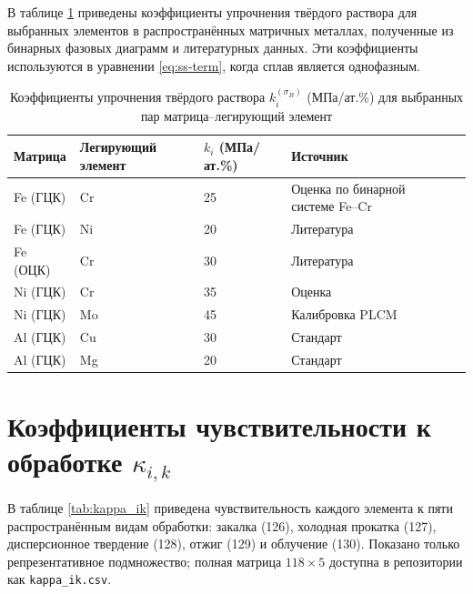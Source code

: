 \documentclass[12pt,a4paper]{article}
\begin{document}
	В таблице \ref{tab:kss} приведены коэффициенты упрочнения твёрдого раствора для выбранных элементов в распространённых матричных металлах, полученные из бинарных фазовых диаграмм и литературных данных. Эти коэффициенты используются в уравнении \ref{eq:ss-term}, когда сплав является однофазным.
	
	\begin{longtable}{p{2cm} p{2cm} p{2cm} p{2cm} p{2cm}}
		\caption{Коэффициенты упрочнения твёрдого раствора $k_i^{(\sigma_B)}$ (МПа/ат.\%) для выбранных пар матрица–легирующий элемент}\label{tab:kss}\\
		\toprule
		\textbf{Матрица} & \textbf{Легирующий элемент} & $k_i$ (МПа/ат.\%) & \textbf{Источник} \\
		\midrule
		Fe (ГЦК) & Cr & 25 & Оценка по бинарной системе Fe–Cr \\
		Fe (ГЦК) & Ni & 20 & Литература \\
		Fe (ОЦК) & Cr & 30 & Литература \\
		Ni (ГЦК) & Cr & 35 & Оценка \\
		Ni (ГЦК) & Mo & 45 & Калибровка PLCM \\
		Al (ГЦК) & Cu & 30 & Стандарт \\
		Al (ГЦК) & Mg & 20 & Стандарт \\
		\bottomrule
	\end{longtable}
	
	\section{Коэффициенты чувствительности к обработке $\kappa_{i,k}$}
	В таблице \ref{tab:kappa_ik} приведена чувствительность каждого элемента к пяти распространённым видам обработки: закалка (126), холодная прокатка (127), дисперсионное твердение (128), отжиг (129) и облучение (130). Показано только репрезентативное подмножество; полная матрица $118\times5$ доступна в репозитории как \texttt{kappa\_ik.csv}.
	
\end{document}
